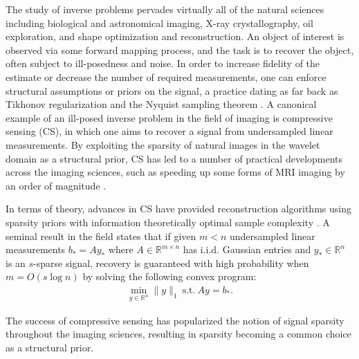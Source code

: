 \documentclass[11pt]{article}
\newcommand{\R}{\mathbb{R}}
\theoremstyle{remark}
\begin{document}

 The study of inverse problems pervades virtually all of the natural sciences including biological and astronomical imaging, X-ray crystallography, oil exploration, and shape optimization and reconstruction. An object of interest is observed via some forward mapping process, and the task is to recover the object, often subject to ill-posedness and noise. In order to increase fidelity of the estimate or decrease the number of required measurements, one can enforce structural assumptions or priors on the signal, a practice dating as far back as Tikhonov regularization \cite{TikReg} and the Nyquist sampling theorem \cite{NyquistShannonSampling}. A canonical example of an ill-posed inverse problem in the field of imaging is compressive sensing (CS), in which one aims to recover a signal from undersampled linear measurements. By exploiting the sparsity of natural images in the wavelet domain as a structural prior, CS has led to a number of practical developments across the imaging sciences, such as speeding up some forms of MRI imaging by an order of magnitude \cite{Dono2007}.

In terms of theory, advances in CS have provided reconstruction algorithms using sparsity priors with information theoretically optimal sample complexity \cite{Tao2006,Donoho2006}. A seminal result in the field states that if given $m < n$ undersampled linear measurements $b_* = Ay_*$ where $A \in \R^{m \times n}$ has i.i.d. Gaussian entries and $y_* \in \R^n$ is an $s$-sparse signal, recovery is guaranteed with high probability when $m = O(s \log n)$ by solving the following convex program:
\begin{align*}
    \min_{y \in \R^n} \|y\|_1\ \text{s.t.}\ Ay = b_*.
\end{align*} 


\noindent 
The success of compressive sensing has popularized the notion of signal sparsity throughout the imaging sciences, resulting in sparsity becoming a common choice as a structural prior.
\end{document}
